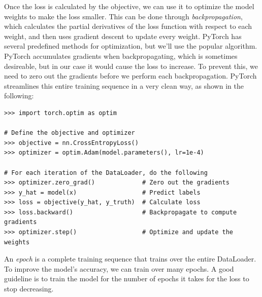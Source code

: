 Once the loss is calculated by the objective, we can use it to optimize the model weights to make the loss smaller.
This can be done through \emph{backpropagation}, which calculates the partial derivatives of the loss function with respect to each weight, and then uses gradient descent to update every weight.
PyTorch has several predefined methods for optimization, but we'll use the popular  algorithm.
PyTorch accumulates gradients when backpropagating, which is sometimes desireable, but in our case it would cause the loss to increase.
To prevent this, we need to zero out the gradients before we perform each backpropagation.
PyTorch streamlines this entire training sequence in a very clean way, as shown in the following:

\begin{lstlisting}
>>> import torch.optim as optim

# Define the objective and optimizer
>>> objective = nn.CrossEntropyLoss()
>>> optimizer = optim.Adam(model.parameters(), lr=1e-4)

# For each iteration of the DataLoader, do the following
>>> optimizer.zero_grad()             # Zero out the gradients
>>> y_hat = model(x)                  # Predict labels
>>> loss = objective(y_hat, y_truth)  # Calculate loss
>>> loss.backward()                   # Backpropagate to compute gradients
>>> optimizer.step()                  # Optimize and update the weights
\end{lstlisting}

An \emph{epoch} is a complete training sequence that trains over the entire DataLoader.
To improve the model's accuracy, we can train over many epochs.
A good guideline is to train the model for the number of epochs it takes for the loss to stop decreasing.

